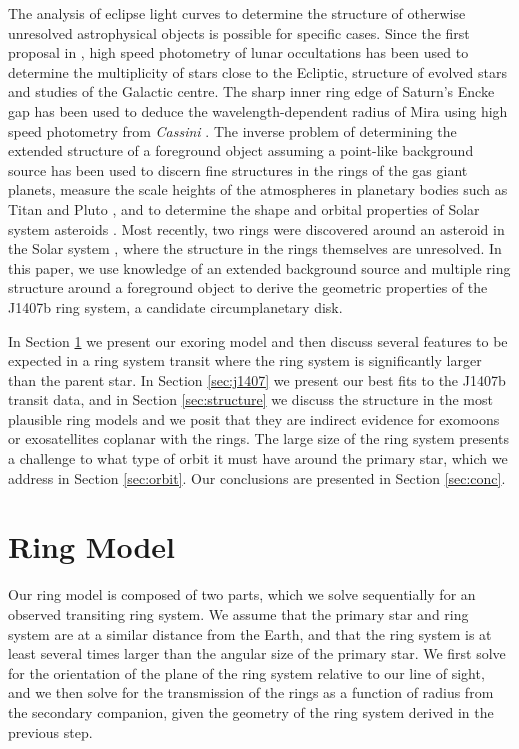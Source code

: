 \documentclass{emulateapj}
\begin{document}
The analysis of eclipse light curves to determine the structure of
otherwise unresolved astrophysical objects is possible for specific
cases.
Since the first proposal in \citet{MacMahon08}, high speed photometry of
lunar occultations has been used \citep{White87} to determine the
multiplicity of stars close to the Ecliptic, structure of evolved stars
and studies of the Galactic centre.
The sharp inner ring edge of Saturn's Encke gap has been used to deduce
the wavelength-dependent radius of Mira using high speed photometry from
{\it Cassini} \citep{Stewart13}.
The inverse problem of determining the extended structure of a
foreground object assuming a point-like background source has been
used to discern fine structures in the rings of the gas giant planets,
measure the scale heights of the atmospheres in planetary bodies such
as Titan and Pluto \citep[e.g.][]{McCarthy08}, and to determine the
shape and orbital properties of Solar system asteroids
\citep[e.g.][]{Dunham90,Shevchenko06}.
Most recently, two rings were discovered around an asteroid in the Solar
system \citep{BragaRibas14}, where the structure in the rings themselves
are unresolved.
In this paper, we use knowledge of an extended background source and
multiple ring structure around a foreground object to derive the
geometric properties of the J1407b ring system, a candidate
circumplanetary disk.

In Section \ref{sec:model} we present our exoring model and then discuss
several features to be expected in a ring system transit where the ring
system is significantly larger than the parent star.
In Section \ref{sec:j1407} we present our best fits to the J1407b
transit data, and in Section \ref{sec:structure} we discuss the structure in the most
plausible ring models and we posit that they are indirect evidence for
exomoons or exosatellites coplanar with the rings.
The large size of the ring system presents a challenge to what type of
orbit it must have around the primary star, which we address in Section
\ref{sec:orbit}.
Our conclusions are presented in Section \ref{sec:conc}.

\section{Ring Model}
\label{sec:model}

Our ring model is composed of two parts, which we solve sequentially for
an observed transiting ring system.
We assume that the primary star and ring system are at a similar
distance from the Earth, and that the ring system is at least several
times larger than the angular size of the primary star.
We first solve for the orientation of the plane of the ring system
relative to our line of sight, and we then solve for the transmission of
the rings as a function of radius from the secondary companion, given
the geometry of the ring system derived in the previous step.
\end{document}
